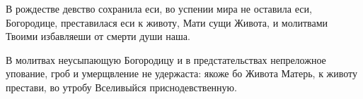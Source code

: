 \begin{mymulticols}


В рождестве девство сохранила еси, во успении мира не оставила еси, Богородице, преставилася еси к животу, Мати сущи Живота, и молитвами Твоими избавляеши от смерти души наша.


В молитвах неусыпающую Богородицу и в предстательствах непреложное упование, гроб и умерщвление не удержаста: якоже бо Живота Матерь, к животу престави, во утробу Вселивыйся приснодевственную.



\end{mymulticols}

